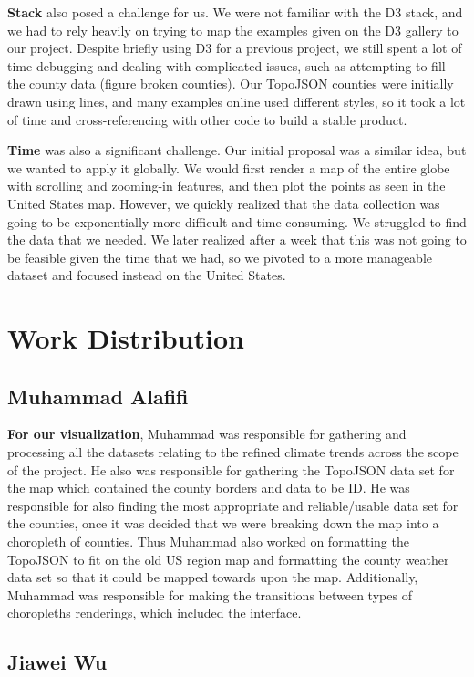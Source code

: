 \documentclass[10pt,twocolumn,twoside]{opticajnl}
\begin{document}
\textbf{Stack} also posed a challenge for us. We were not familiar with the D3 stack, and we had to rely heavily on trying to map the examples given on the D3 gallery \cite{d3_2020_gallery} to our project. Despite briefly using D3 for a previous project, we still spent a lot of time debugging and dealing with complicated issues, such as attempting to fill the county data (figure broken counties). Our TopoJSON counties were initially drawn using lines, and many examples online used different styles, so it took a lot of time and cross-referencing with other code to build a stable product.

\textbf{Time} was also a significant challenge. Our initial proposal was a similar idea, but we wanted to apply it globally. We would first render a map of the entire globe with scrolling and zooming-in features, and then plot the points as seen in the United States map. However, we quickly realized that the data collection was going to be exponentially more difficult and time-consuming. We struggled to find the data that we needed. We later realized after a week that this was not going to be feasible given the time that we had, so we pivoted to a more manageable dataset and focused instead on the United States.

\section {Work Distribution}

\subsection {Muhammad Alafifi}
\textbf{For our visualization}, Muhammad was responsible for gathering and processing all the datasets relating to the refined climate trends across the scope of the project. He also was responsible for gathering the TopoJSON data set for the map which contained the county borders and data to be ID. He was responsible for also finding the most appropriate and reliable/usable data set for the counties, once it was decided that we were breaking down the map into a choropleth of counties. Thus Muhammad also worked on formatting the TopoJSON to fit on the old US region map and formatting the county weather data set so that it could be mapped towards upon the map. Additionally, Muhammad was responsible for making the transitions between types of choropleths renderings, which included the interface.

\subsection {Jiawei Wu}
\end{document}
